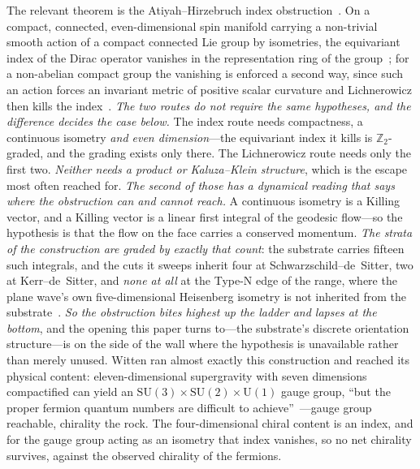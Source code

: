 \documentclass[11pt]{article}
\theoremstyle{plain}
\theoremstyle{remark}
\newcommand{\SU}{\mathrm{SU}}
\begin{document}
The relevant theorem is the Atiyah--Hirzebruch index obstruction~\cite{AtiyahHirzebruch1970}. On a compact, connected, even-dimensional spin manifold carrying a non-trivial smooth action of a compact connected Lie group by isometries, the equivariant index of the Dirac operator vanishes in the representation ring of the group~\cite{AtiyahSinger1968,LawsonMichelsohn1989}; for a non-abelian compact group the vanishing is enforced a second way, since such an action forces an invariant metric of positive scalar curvature and Lichnerowicz then kills the index~\cite{LawsonYau,Lichnerowicz1963}. \emph{The two routes do not require the same hypotheses, and the difference decides the case below.} The index route needs compactness, a continuous isometry \emph{and even dimension}---the equivariant index it kills is $\mathbb{Z}_{2}$-graded, and the grading exists only there. The Lichnerowicz route needs only the first two. \emph{Neither needs a product or Kaluza--Klein structure}, which is the escape most often reached for. \emph{The second of those has a dynamical reading that says where the obstruction can and cannot reach.} A continuous isometry is a Killing vector, and a Killing vector is a linear first integral of the geodesic flow---so the hypothesis is that the flow on the face carries a conserved momentum. \emph{The strata of the construction are graded by exactly that count}: the substrate carries fifteen such integrals, and the cuts it sweeps inherit four at Schwarzschild--de~Sitter, two at Kerr--de~Sitter, and \emph{none at all} at the Type-N edge of the range, where the plane wave's own five-dimensional Heisenberg isometry is not inherited from the substrate~\cite{JanzenAlgebroid,JanzenRange,JanzenDynamics}. \emph{So the obstruction bites highest up the ladder and lapses at the bottom}, and the opening this paper turns to---the substrate's discrete orientation structure---is on the side of the wall where the hypothesis is unavailable rather than merely unused. Witten ran almost exactly this construction and reached its physical content: eleven-dimensional supergravity with seven dimensions compactified can yield an $\SU(3)\times\SU(2)\times\mathrm{U}(1)$ gauge group, ``but the proper fermion quantum numbers are difficult to achieve''~\cite{Witten1981,Witten1983}---gauge group reachable, chirality the rock. The four-dimensional chiral content is an index, and for the gauge group acting as an isometry that index vanishes, so no net chirality survives, against the observed chirality of the fermions.
\end{document}
